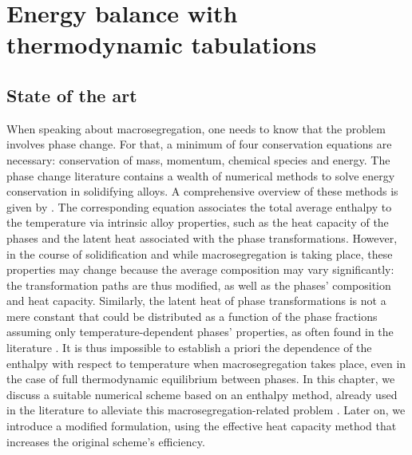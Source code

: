 \chapter{Energy balance with thermodynamic tabulations}
\begin{nolinkcolors} 
\minitoc
\end{nolinkcolors}
\newpage
%
%
\section{State of the art}
%
%
%
When speaking about macrosegregation, one needs to know that the problem involves phase change.
For that, a minimum of four conservation equations are necessary:
conservation  of  mass, momentum,  chemical  species and  energy. The  phase  change
literature  contains a  wealth of numerical methods to solve energy conservation
in solidifying alloys. A comprehensive overview of these methods is given by \citet{swaminathan._enthalpy_1993}.
The corresponding equation associates the total average enthalpy to the
temperature  via  intrinsic  alloy  properties, such  as the heat  capacity of  the
phases and the latent  heat associated with the phase transformations. However, in the course
of solidification and while macrosegregation is taking place, these  properties may change because the average
composition may  vary  significantly: the  transformation paths are thus modified, as well as
the phases' composition and heat capacity. Similarly, the latent heat of phase  transformations
is  not a mere constant that could be distributed as a function of the phase fractions
assuming only temperature-dependent phases' properties, as often found in the literature \citep{bellet_call_2009}.
It is thus impossible to establish a priori the dependence of the enthalpy with respect
to temperature when macrosegregation takes place, even in the case of full thermodynamic equilibrium
between phases. In this chapter, we discuss a suitable numerical scheme based on an enthalpy method,
already used in the literature  to  alleviate this macrosegregation-related problem \citep{swaminathan._enthalpy_1993,
carozzani_direct_2013}. Later on, we introduce a modified formulation, using the effective heat capacity method that 
increases the original scheme's efficiency. 

